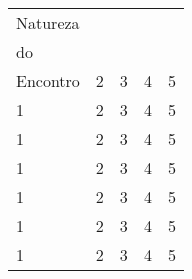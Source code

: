 \documentclass[11pt,a4paper]{article}
\begin{document}
\begin{tabular}{|p{2cm}|p{3cm}|p{5cm}|p{3cm}|p{3cm}|} \hline
	Natureza \\do\\ Encontro & 2 & 3 & 4 & 5 \\ \hline
	1 & 2 & 3 & 4 & 5 \\ \hline
	1 & 2 & 3 & 4 & 5 \\ \hline
	1 & 2 & 3 & 4 & 5 \\ \hline
	1 & 2 & 3 & 4 & 5 \\ \hline
	1 & 2 & 3 & 4 & 5 \\ \hline
	1 & 2 & 3 & 4 & 5 \\ \hline
\end{tabular}
\end{document}
